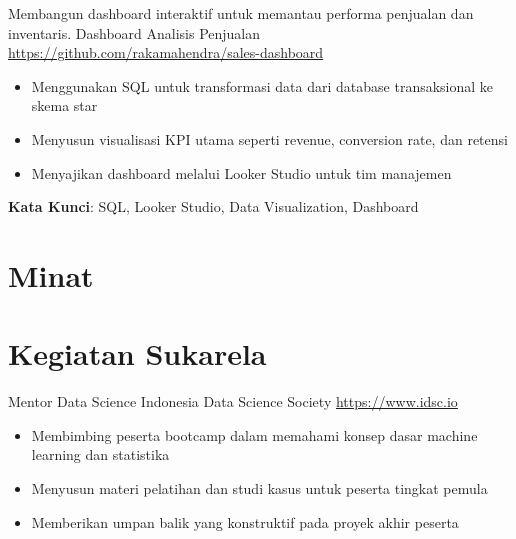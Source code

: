 \documentclass[a4paper, serif, 10pt]{moderncv}
\begin{document}
        {Membangun dashboard interaktif untuk memantau performa penjualan dan inventaris.
}
        {Dashboard Analisis Penjualan}
        {\url{https://github.com/rakamahendra/sales-dashboard}}
        {}
        {\begin{itemize}
\item Menggunakan SQL untuk transformasi data dari database transaksional ke skema star
\item Menyusun visualisasi KPI utama seperti revenue, conversion rate, dan retensi
\item Menyajikan dashboard melalui Looker Studio untuk tim manajemen
\end{itemize}
\textbf{Kata Kunci}: SQL, Looker Studio, Data Visualization, Dashboard}
\section{Minat}

\section{Kegiatan Sukarela}

        {Mentor Data Science}
        {Indonesia Data Science Society}
        {\url{https://www.idsc.io}}
        {}
        {\begin{itemize}
\item Membimbing peserta bootcamp dalam memahami konsep dasar machine learning dan statistika
\item Menyusun materi pelatihan dan studi kasus untuk peserta tingkat pemula
\item Memberikan umpan balik yang konstruktif pada proyek akhir peserta
\end{itemize}}
    
\end{document}
